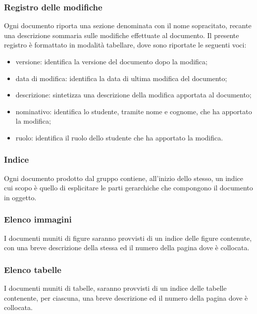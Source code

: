 \subsubsection{Registro delle modifiche}
Ogni documento riporta una sezione denominata con il nome sopracitato, recante una descrizione sommaria sulle modifiche effettuate al documento. Il presente registro è formattato in modalità tabellare, dove sono riportate le seguenti voci:	
\begin{itemize}
	\item versione: identifica la versione del documento dopo la modifica;
	\item data di modifica: identifica la data di ultima modifica del documento;
	\item descrizione: sintetizza una descrizione della modifica apportata al documento;
	\item nominativo: identifica lo studente, tramite nome e cognome, che ha apportato la modifica;
	\item ruolo: identifica il ruolo dello studente che ha apportato la modifica.
\end{itemize}

\subsubsection{Indice}
Ogni documento prodotto dal gruppo {\Gruppo} contiene, all’inizio dello stesso, un indice cui scopo è quello di esplicitare le parti gerarchiche che compongono il documento in oggetto. 

\subsubsection{Elenco immagini}
I documenti muniti di figure saranno provvisti di un indice delle figure contenute, con una breve descrizione della stessa ed il numero della pagina dove è collocata.

\subsubsection{Elenco tabelle}
I documenti muniti di tabelle, saranno provvisti di un indice delle tabelle contenente, per
ciascuna, una breve descrizione ed il numero della pagina dove è collocata.

